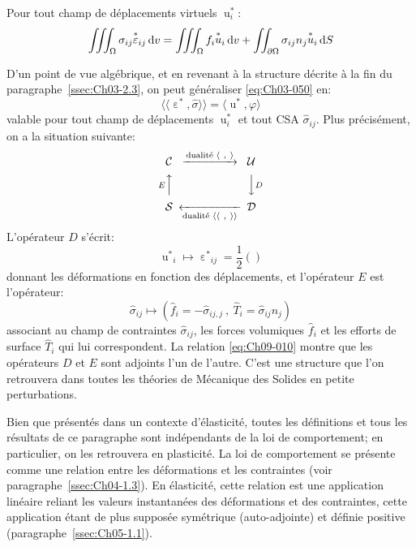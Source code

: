 \begin{thm}
    Pour tout champ de déplacements virtuels ${\mathop{u}_{i}^{\ast}}$:
    \begin{equation}
        \iiint_{\Omega} \sigma_{ij} {\mathop{\varepsilon}^{\ast}}_{ij} \mathop{\mathrm{{}d}}\mathopen{} v = \iiint_{\Omega} f_i {\mathop{u}^{\ast}}_i \mathop{\mathrm{{}d}}\mathopen{} v + \iint_{\partial \Omega} \sigma_{ij} n_j {\mathop{u}^{\ast}}_i \mathop{\mathrm{{}d}}\mathopen{} S
        \label{eq:Ch09-009}
    \end{equation}
\end{thm}

D'un point de vue algébrique, et en revenant à la structure décrite à la fin du paragraphe~\ref{ssec:Ch03-2.3}, on peut généraliser \eqref{eq:Ch03-050} en:
\begin{equation}
    \langle \langle \mathop{\varepsilon}^{\ast}, \hat{\sigma} \rangle \rangle = \langle \mathop{u}^{\ast}, \varphi \rangle
    \label{eq:Ch09-010}
\end{equation}
valable pour tout champ de déplacements ${\mathop{u}_i^{\ast}}$ et tout CSA $\hat{\sigma}_{ij}$.
Plus précisément, on a la situation suivante:
\[
\begin{CD}
    \mathcal{C} @>{\text{dualité } \langle\ ,\ \rangle}>> \mathcal{U} \\
    @AEAA    @VVDV \\
    \mathcal{S} @<<{\text{dualité } \langle\langle\ ,\ \rangle\rangle}< \mathcal{D}
\end{CD}
\]
L'opérateur $D$ s'écrit:
\begin{equation}
    {\mathop{u}^{\ast}}_i \mapsto {\mathop{\varepsilon}^{\ast}}_{ij} = \frac{1}{2} \left(  \right)
    \label{eq:Ch09-011}
\end{equation}
donnant les déformations en fonction des déplacements, et l'opérateur $E$ est l'opérateur:
\begin{equation}
    \hat{\sigma}_{ij} \mapsto \left( \hat{f}_i = - \hat{\sigma}_{ij,j}\ , \ \hat{T}_i = \hat{\sigma}_{ij} n_j \right)
    \label{eq:Ch09-012}
\end{equation}
associant au champ de contraintes $\hat{\sigma}_{ij}$, les forces volumiques $\hat{f}_i$ et les efforts de surface $\hat{T}_i$ qui lui correspondent.
La relation \eqref{eq:Ch09-010} montre que les opérateurs $D$ et $E$ sont adjoints l'un de l'autre.
C'est une structure que l'on retrouvera dans toutes les théories de Mécanique des Solides en petite perturbations.

Bien que présentés dans un contexte d'élasticité, toutes les définitions et tous les résultats de ce paragraphe sont indépendants de la loi de comportement; en particulier, on les retrouvera en plasticité.
La loi de comportement se présente comme une relation entre les déformations et les contraintes (voir paragraphe~\ref{ssec:Ch04-1.3}).
En élasticité, cette relation est une application linéaire reliant les valeurs instantanées des déformations et des contraintes, cette application étant de plus supposée symétrique (auto-adjointe) et définie positive (paragraphe~\ref{ssec:Ch05-1.1}). 
